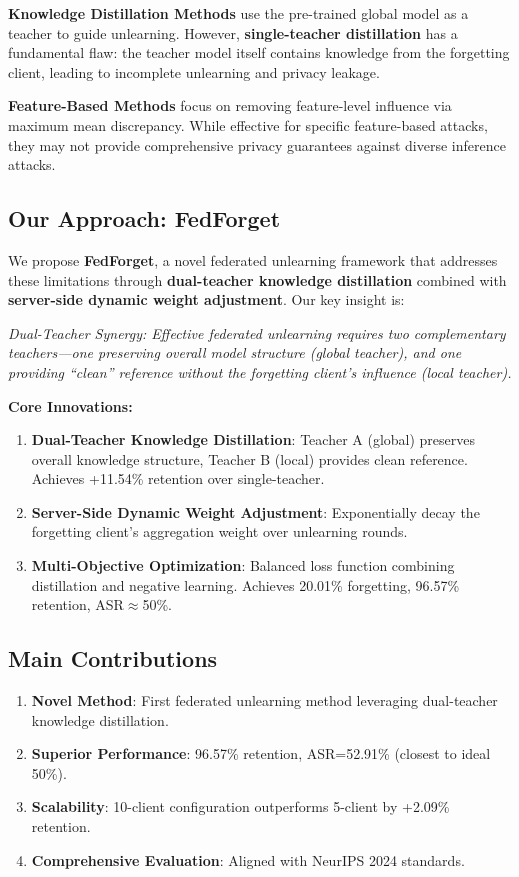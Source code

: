 \documentclass[10pt,twocolumn]{article}
\begin{document}
\textbf{Knowledge Distillation Methods} use the pre-trained global model as a teacher to guide unlearning. However, \textbf{single-teacher distillation} has a fundamental flaw: the teacher model itself contains knowledge from the forgetting client, leading to incomplete unlearning and privacy leakage.

\textbf{Feature-Based Methods} focus on removing feature-level influence via maximum mean discrepancy. While effective for specific feature-based attacks, they may not provide comprehensive privacy guarantees against diverse inference attacks.

\subsection{Our Approach: FedForget}

We propose \textbf{FedForget}, a novel federated unlearning framework that addresses these limitations through \textbf{dual-teacher knowledge distillation} combined with \textbf{server-side dynamic weight adjustment}. Our key insight is:

\textit{Dual-Teacher Synergy: Effective federated unlearning requires two complementary teachers---one preserving overall model structure (global teacher), and one providing ``clean'' reference without the forgetting client's influence (local teacher).}

\textbf{Core Innovations:}

\begin{enumerate}
\item \textbf{Dual-Teacher Knowledge Distillation}: Teacher A (global) preserves overall knowledge structure, Teacher B (local) provides clean reference. Achieves +11.54\% retention over single-teacher.
\item \textbf{Server-Side Dynamic Weight Adjustment}: Exponentially decay the forgetting client's aggregation weight over unlearning rounds.
\item \textbf{Multi-Objective Optimization}: Balanced loss function combining distillation and negative learning. Achieves 20.01\% forgetting, 96.57\% retention, ASR$\approx$50\%.
\end{enumerate}

\subsection{Main Contributions}

\begin{enumerate}
\item \textbf{Novel Method}: First federated unlearning method leveraging dual-teacher knowledge distillation.
\item \textbf{Superior Performance}: 96.57\% retention, ASR=52.91\% (closest to ideal 50\%).
\item \textbf{Scalability}: 10-client configuration outperforms 5-client by +2.09\% retention.
\item \textbf{Comprehensive Evaluation}: Aligned with NeurIPS 2024 standards.
\end{enumerate}
\end{document}
